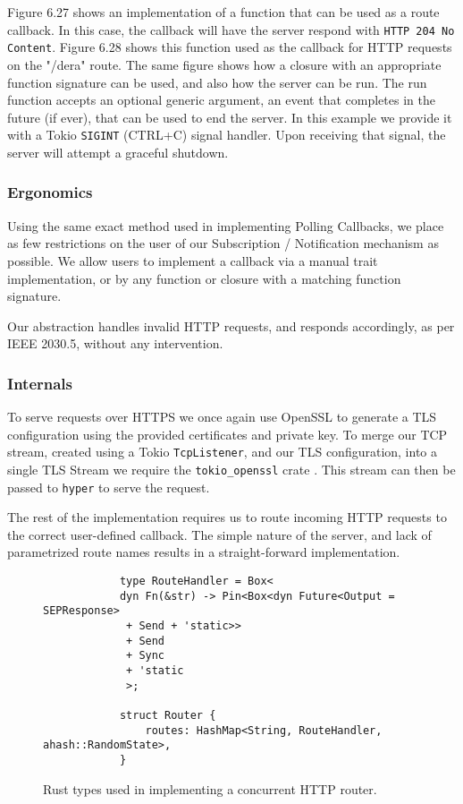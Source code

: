 Figure 6.27 shows an implementation of a function that can be used as a route callback. In this case, the callback will have the server respond with \texttt{HTTP 204 No Content}. Figure 6.28 shows this function used as the callback for HTTP requests on the "/dera" route. The same figure shows how a closure with an appropriate function signature can be used, and also how the server can be run. 
The run function accepts an optional generic argument, an event that completes in the future (if ever), that can be used to end the server. In this example we provide it with a Tokio \texttt{SIGINT} (CTRL+C) signal handler. Upon receiving that signal, the server will attempt a graceful shutdown.

\subsubsection{Ergonomics}
Using the same exact method used in implementing Polling Callbacks, we place as few restrictions on the user of our Subscription / Notification mechanism as possible. We allow users to implement a callback via a manual trait implementation, or by any function or closure with a matching function signature.

Our abstraction handles invalid HTTP requests, and responds accordingly, as per IEEE 2030.5, without any intervention.

\subsubsection{Internals}
To serve requests over HTTPS we once again use OpenSSL to generate a TLS configuration using the provided certificates and private key. To merge our TCP stream, created using a Tokio \texttt{TcpListener}, and our TLS configuration, into a single TLS Stream we require the \texttt{tokio\_openssl} crate \cite{tokioopenssl}. This stream can then be passed to \texttt{hyper} to serve the request.

The rest of the implementation requires us to route incoming HTTP requests to the correct user-defined callback. The simple nature of the server, and lack of parametrized route names results in a straight-forward implementation.

\begin{figure}[h]
    \begin{center}
        \begin{lstlisting}
            type RouteHandler = Box<
            dyn Fn(&str) -> Pin<Box<dyn Future<Output = SEPResponse>
             + Send + 'static>>
             + Send
             + Sync
             + 'static
             >;

            struct Router {
                routes: HashMap<String, RouteHandler, ahash::RandomState>,
            }

        \end{lstlisting}
        \label{fig:routerimpl}
        \vspace{-10pt}
        \caption{Rust types used in implementing a concurrent HTTP router.}
    \end{center}
\end{figure}

